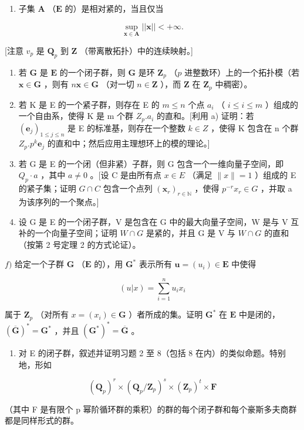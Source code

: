 \begin{enumerate}
\def\labelenumi{\alph{enumi})}
\tightlist
\item
  子集 \(\mathbf{A}\) （\(\mathbf{E}\) 的）是相对紧的，当且仅当
\end{enumerate}

\[
\sup _ {\mathbf {x} \in \mathbf {A}} | | \mathbf {x} | | <   + \infty .
\]

{[}注意 \(v_{p}\) 是 \(\mathbf{Q}_p\) 到 \(\mathbf{Z}\) （带离散拓扑）中的连续映射。{]}

\begin{enumerate}
\def\labelenumi{\alph{enumi})}
\setcounter{enumi}{1}
\item
  若 \(\mathbf{G}\) 是 \(\mathbf{E}\) 的一个闭子群，则 \(\mathbf{G}\) 是环 \(\mathbf{Z}_p\) （\(p\) 进整数环）上的一个拓扑模（若 \(\boldsymbol{x} \in \mathbf{G}\) ，则有 \(n\boldsymbol{x} \in \mathbf{G}\) （对一切 \(n \in \mathbf{Z}\) ），而 \(\mathbf{Z}\) 在 \(\mathbf{Z}_p\) 中稠密）。
\item
  若 K 是 E 的一个紧子群，则存在 E 的 \(m \leqslant n\) 个点 \(a_{i}\) （ \(i \leqslant i \leqslant m\) ）组成的一个自由系，使得 K 是 m 个群 \(Z_{p}.a_{i}\) 的直和。{[}利用 a) 证明：若 \((\boldsymbol{e}_{j})_{1 \leqslant j \leqslant n}\) 是 E 的标准基，则存在一个整数 \(k \in Z\) ，使得 K 包含在 n 个群 \(Z_{p}.p^{k}\boldsymbol{e}_{j}\) 的直和中；然后应用主理想环上的模的理论。{]}
\item
  若 G 是 E 的一个闭（但非紧）子群，则 G 包含一个一维向量子空间，即 \(Q_{p} \cdot a\) ，其中 \(a \neq 0\) 。{[}设 C 是由所有点 \(x \in E\) （满足 \(\|x\| = 1\) ）组成的 E 的紧子集；证明 \(G \cap C\) 包含一个点列 \((\boldsymbol{x}_{r})_{r \in \mathbb{N}}\) ，使得 \(p^{-r}x_{r} \in G\) ，并取 a 为该序列的一个聚点。{]}
\item
  设 G 是 E 的一个闭子群，V 是包含在 G 中的最大向量子空间，W 是与 V 互补的一个向量子空间；证明 \(W \cap G\) 是紧的，并且 G 是 V 与 \(W \cap G\) 的直和（按第 2 号定理 2 的方式论证）。
\end{enumerate}

\(f)\) 给定一个子群 \(\mathbf{G}\) （\(\mathbf{E}\) 的），用 \(\mathbf{G}^*\) 表示所有 \(\boldsymbol{u} = (u_i) \in \mathbf{E}\) 中使得

\[
(u | x) = \sum_ {i = 1} ^ {n} u _ {i} x _ {i}
\]

属于 \(\mathbf{Z}_p\) （对所有 \(x = (x_i) \in \mathbf{G}\) ）者所成的集。证明 \(\mathbf{G}^*\) 在 \(\mathbf{E}\) 中是闭的，\((\overline{\mathbf{G}})^* = \mathbf{G}^*\) ，并且 \((\mathbf{G}^*)^* = \overline{\mathbf{G}}\) 。

\begin{enumerate}
\def\labelenumi{\alph{enumi})}
\setcounter{enumi}{6}
\tightlist
\item
  对 E 的闭子群，叙述并证明习题 2 至 8（包括 8 在内）的类似命题。特别地，形如
\end{enumerate}

\[
(\mathbf {Q} _ {p}) ^ {r} \times (\mathbf {Q} _ {p} / \mathbf {Z} _ {p}) ^ {s} \times (\mathbf {Z} _ {p}) ^ {t} \times \mathbf {F}
\]

（其中 F 是有限个 p 幂阶循环群的乘积）的群的每个闭子群和每个豪斯多夫商群都是同样形式的群。

